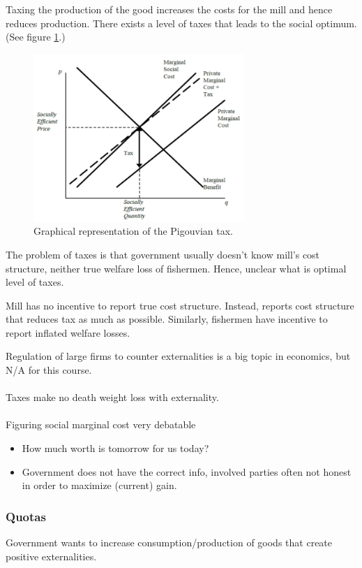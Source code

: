 \documentclass[12pt, a4paper, titlepage]{extarticle}
\begin{document}
	Taxing the production of the good increases the costs for the mill and hence reduces production. There exists a level of taxes that leads to the social optimum. (See figure \ref{imgPigouvianTax}.)
	\begin{figure}[h]
	\centering
		\includegraphics[width=8cm]{PigouvianTax}
		\caption{Graphical representation of the Pigouvian tax. \label{imgPigouvianTax}}
	\end{figure}
	
	The problem of taxes is that government usually doesn't know mill's cost structure, neither true welfare loss of fishermen. Hence, unclear what is optimal level of taxes.
	
	Mill has no incentive to report true cost structure. Instead, reports cost structure that reduces tax as much as possible. Similarly, fishermen have incentive to report inflated welfare losses.
	
	Regulation of large firms to counter externalities is a big topic in economics, but N/A for this course.\\
	\\
	Taxes make no death weight loss with externality.\\
	\\
	Figuring social marginal cost very debatable
	\begin{itemize}
		\item How much worth is tomorrow for us today?
		\item Government does not have the correct info, involved parties often not honest in order to maximize (current) gain.
	\end{itemize}
	
	\subsubsection*{Quotas}
	Government wants to increase consumption/production of goods that create positive externalities.
	
\end{document}
